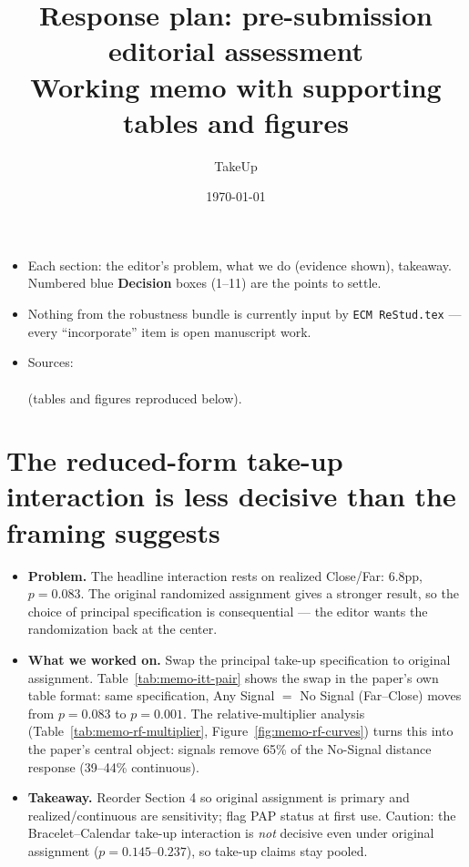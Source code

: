 \documentclass[11pt]{article}
\title{Response plan: pre-submission editorial assessment\\
  \large Working memo with supporting tables and figures}
\author{TakeUp}
\date{\today}
\begin{document}
\maketitle

\begin{itemize}[nosep]
  \item Each section: the editor's problem, what we do (evidence shown), takeaway.
    Numbered blue \textcolor{blue!50!black}{\textbf{Decision}} boxes (1--11) are the
    points to settle.
  \item Nothing from the robustness bundle is currently input by
    \texttt{ECM ReStud.tex} --- every ``incorporate'' item is open manuscript work.
  \item Sources:\\
    \\
     (tables and figures reproduced below).
\end{itemize}

\tableofcontents

\clearpage
\section{The reduced-form take-up interaction is less decisive than the framing suggests}

\begin{itemize}[nosep]
  \item \textbf{Problem.} The headline interaction rests on realized Close/Far: 6.8pp,
    $p=0.083$. The original randomized assignment gives a stronger result, so the choice
    of principal specification is consequential --- the editor wants the randomization
    back at the center.
  \item \textbf{What we worked on.} Swap the principal take-up specification to original
    assignment. Table~\ref{tab:memo-itt-pair} shows the swap in the paper's own table
    format: same specification, Any Signal $=$ No Signal (Far--Close) moves from
    $p=0.083$ to $p=0.001$. The relative-multiplier analysis
    (Table~\ref{tab:memo-rf-multiplier}, Figure~\ref{fig:memo-rf-curves}) turns this
    into the paper's central object: signals remove 65\% of the No-Signal distance
    response (39--44\% continuous).
  \item \textbf{Takeaway.} Reorder Section 4 so original assignment is primary and
    realized/continuous are sensitivity; flag PAP status at first use. Caution: the
    Bracelet--Calendar take-up interaction is \emph{not} decisive even under original
    assignment ($p=0.145$--$0.237$), so take-up claims stay pooled.
\end{itemize}
\end{document}
